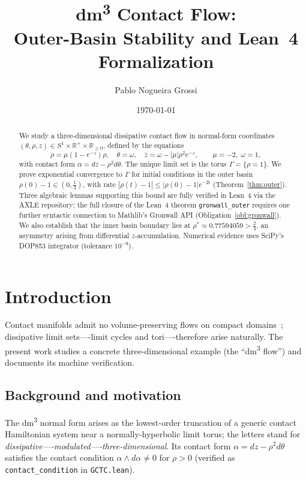 \documentclass[12pt]{amsart}
\title[dm\textsuperscript{3} Contact Flow: Stability and Lean 4 Formalization]%
      {dm\textsuperscript{3} Contact Flow:\\
       Outer-Basin Stability and Lean~4 Formalization}
\author{Pablo Nogueira Grossi}
\date{\today}
\theoremstyle{definition}
\theoremstyle{remark}
\newcommand{\R}{\mathbb{R}}
\newcommand{\lean}[1]{\texttt{#1}}
\newcommand{\rhostar}{\rho^{*}}
\begin{document}
\maketitle

\begin{abstract}
We study a three-dimensional dissipative contact flow in
normal-form coordinates $(\theta,\rho,z)\in
S^{1}\!\times\R^{+}\!\times\R_{\ge 0}$, defined by the
equations
\[
  \dot\rho = \mu(1-e^{-z})\rho,\quad
  \dot\theta = \omega,\quad
  \dot z = \omega - |\mu|\rho^{2}e^{-z},
  \qquad \mu=-2,\;\omega=1,
\]
with contact form $\alpha=dz-\rho^{2}d\theta$.
The unique limit set is the torus $\Gamma=\{\rho=1\}$.
We prove exponential convergence to $\Gamma$ for initial
conditions in the outer basin $\rho(0)-1\in(0,\tfrac{1}{3})$,
with rate $|\rho(t)-1|\le|\rho(0)-1|e^{-2t}$ (Theorem~\ref{thm:outer}).
Three algebraic lemmas supporting this bound are fully verified
in Lean~4 via the AXLE repository; the full closure of the
Lean~4 theorem \lean{gronwall\_outer} requires one further
syntactic connection to Mathlib's Gronwall API (Obligation~\ref{obl:gronwall}).
We also establish that the inner basin boundary lies at
$\rhostar\approx 0.77594059 > \tfrac{2}{3}$, an asymmetry arising
from differential $z$-accumulation.
Numerical evidence uses SciPy's DOP853 integrator
(tolerance $10^{-9}$).
\end{abstract}

\tableofcontents

\section{Introduction}\label{sec:intro}

Contact manifolds admit no volume-preserving flows on compact
domains~\cite[Prop.\,2.2.4]{Geiges2008}; dissipative limit
sets----limit cycles and tori----therefore arise naturally.
The present work studies a concrete three-dimensional example
(the ``dm\textsuperscript{3} flow'') and documents its machine verification.

\subsection*{Background and motivation}

The dm\textsuperscript{3} normal form arises as the lowest-order truncation of a
generic contact Hamiltonian system near a normally-hyperbolic
limit torus; the letters stand for
\emph{dissipative----modulated----three-dimensional}.
Its contact form $\alpha=dz-\rho^{2}d\theta$ satisfies the
contact condition $\alpha\wedge d\alpha\ne 0$ for $\rho>0$
(verified as \lean{contact\_condition} in \texttt{GCTC.lean}).
\end{document}
